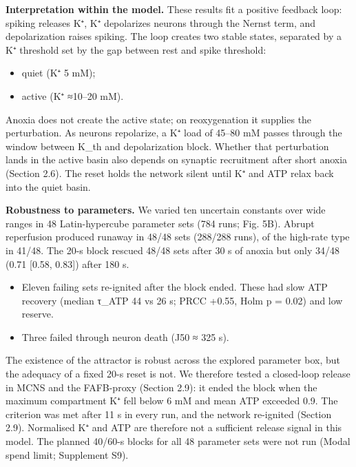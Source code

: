 \documentclass[11pt]{article}
\providecommand{\tightlist}{\setlength{\itemsep}{0pt}\setlength{\parskip}{0pt}}
\begin{document}
\textbf{Interpretation within the model.} These results fit a positive feedback loop: spiking releases K⁺, K⁺ depolarizes neurons through the Nernst term, and depolarization raises spiking. The loop creates two stable states, separated by a K⁺ threshold set by the gap between rest and spike threshold:

\begin{itemize}
\tightlist
\item
  quiet (K⁺ 5 mM);
\item
  active (K⁺ ≈10--20 mM).
\end{itemize}

Anoxia does not create the active state; on reoxygenation it supplies the perturbation. As neurons repolarize, a K⁺ load of 45--80 mM passes through the window between K\_th and depolarization block. Whether that perturbation lands in the active basin also depends on synaptic recruitment after short anoxia (Section 2.6). The reset holds the network silent until K⁺ and ATP relax back into the quiet basin.

\textbf{Robustness to parameters.} We varied ten uncertain constants over wide ranges in 48 Latin-hypercube parameter sets (784 runs; Fig. 5B). Abrupt reperfusion produced runaway in 48/48 sets (288/288 runs), of the high-rate type in 41/48. The 20-s block rescued 48/48 sets after 30 s of anoxia but only 34/48 (0.71 {[}0.58, 0.83{]}) after 180 s.

\begin{itemize}
\tightlist
\item
  Eleven failing sets re-ignited after the block ended. These had slow ATP recovery (median τ\_ATP 44 vs 26 s; PRCC +0.55, Holm p = 0.02) and low reserve.
\item
  Three failed through neuron death (J50 ≈ 325 s).
\end{itemize}

The existence of the attractor is robust across the explored parameter box, but the adequacy of a fixed 20-s reset is not. We therefore tested a closed-loop release in MCNS and the FAFB-proxy (Section 2.9): it ended the block when the maximum compartment K⁺ fell below 6 mM and mean ATP exceeded 0.9. The criterion was met after 11 s in every run, and the network re-ignited (Section 2.9). Normalised K⁺ and ATP are therefore not a sufficient release signal in this model. The planned 40/60-s blocks for all 48 parameter sets were not run (Modal spend limit; Supplement S9).
\end{document}
